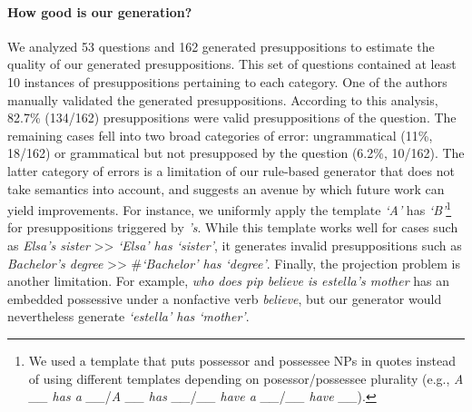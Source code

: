 \documentclass[11pt,a4paper]{article}
\begin{document}
\paragraph{How good is our generation?}
We analyzed 53 questions and 162 generated presuppositions to estimate the quality of our generated presuppositions. This set of questions contained at least 10 instances of presuppositions pertaining to each category. One of the authors manually validated the generated presuppositions. According to this analysis, 82.7\% (134/162) presuppositions were valid presuppositions of the question. The remaining cases fell into two broad categories of error: ungrammatical (11\%, 18/162) or grammatical but not presupposed by the question (6.2\%, 10/162). The latter category of errors is a limitation of our rule-based generator that does not take semantics into account, and suggests an avenue by which future work can yield improvements. For instance, we uniformly apply the template \textit{`A'} has \textit{`B'}\footnote{We used a template that puts possessor and possessee NPs in quotes instead of using different templates depending on posessor/possessee plurality (e.g., \textit{A \_\_ has a \_\_}/\textit{A \_\_ has \_\_}/\textit{\_\_ have a \_\_}/\textit{\_\_ have \_\_}).} for presuppositions triggered by \textit{'s}. While this template works well for cases such as \textit{Elsa's sister} >> \textit{`Elsa' has `sister'}, it generates invalid presuppositions such as \textit{Bachelor's degree} >> \#\textit{`Bachelor' has `degree'}. Finally, the projection problem is another limitation. For example, \textit{who does pip believe is estella's mother} has an embedded possessive under a nonfactive verb \textit{believe}, but our generator would nevertheless generate \textit{`estella' has `mother'}.
\end{document}
